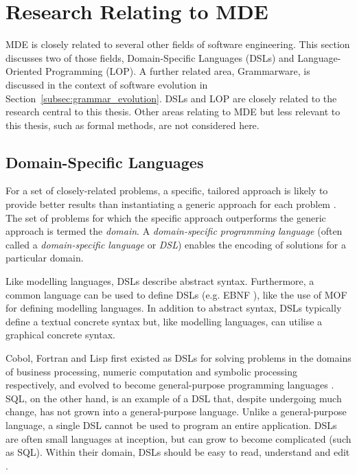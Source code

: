 
\section{Research Relating to MDE}
\label{sec:mde_related}
MDE is closely related to several other fields of software engineering. This section discusses two of those fields, Domain-Specific Languages (DSLs) and Language-Oriented Programming (LOP). A further related area, Grammarware, is discussed in the context of software evolution in Section~\ref{subsec:grammar_evolution}. DSLs and LOP are closely related to the research central to this thesis. Other areas relating to MDE but less relevant to this thesis, such as formal methods, are not considered here.

\subsection{Domain-Specific Languages}
\label{subsec:dsls}
For a set of closely-related problems, a specific, tailored approach is likely to provide better results than instantiating a generic approach for each problem \cite{deursen00dslbib}. The set of problems for which the specific approach outperforms the generic approach is termed the \emph{domain}. A \emph{domain-specific programming language} (often called a \emph{domain-specific language} or \emph{DSL}) enables the encoding of solutions for a particular domain.

Like modelling languages, DSLs describe abstract syntax. Furthermore, a common language can be used to define DSLs (e.g. EBNF \cite{ebnf}), like the use of MOF for defining modelling languages. In addition to abstract syntax, DSLs typically define a textual concrete syntax but, like modelling languages, can utilise a graphical concrete syntax.

Cobol, Fortran and Lisp first existed as DSLs for solving problems in the domains of business processing, numeric computation and symbolic processing respectively, and evolved to become general-purpose programming languages \cite{deursen00dslbib}. SQL, on the other hand, is an example of a DSL that, despite undergoing much change, has not grown into a general-purpose language. Unlike a general-purpose language, a single DSL cannot be used to program an entire application. DSLs are often small languages at inception, but can grow to become complicated (such as SQL). Within their domain, DSLs should be easy to read, understand and edit \cite{fowler05language}.

